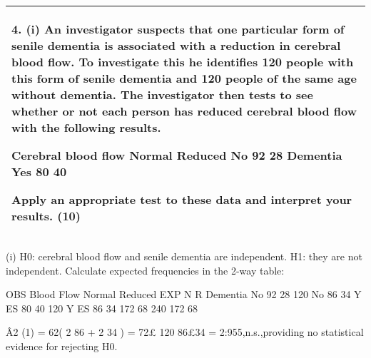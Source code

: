 \documentclass[a4paper,12pt]{article}
\begin{document}
\begin{table}[ht!]
 
\centering
 
\begin{tabular}{|p{15cm}|}
 
\hline  



4. (i) An investigator suspects that one particular form of senile dementia is associated with a reduction in cerebral blood flow.  To investigate this he identifies 120 people with this form of senile dementia and 120 people of the same age without dementia.  The investigator then tests to see whether or not each person has reduced cerebral blood flow with the following results. 
 
Cerebral blood flow  Normal 
Reduced  No 92 28 
Dementia     Yes 80 40 
 
 
  Apply an appropriate test to these data and interpret your results. 
(10) 
\\ \hline
  
\end{tabular}

\end{table} 




    \item (i) H0: cerebral blood flow and senile dementia are independent.
H1: they are not independent.
Calculate expected frequencies in the 2-way table:

OBS Blood Flow Normal Reduced 
EXP N R
Dementia No 92 28 120 No 86 34
Y ES 80 40 120 Y ES 86 34
172 68 240 172 68

Â2
(1) = 62( 2
86 + 2
34 ) = 72£ 120
86£34 = 2:955,n.s.,providing no statistical evidence for rejecting
H0.

\newpage
\end{document}
